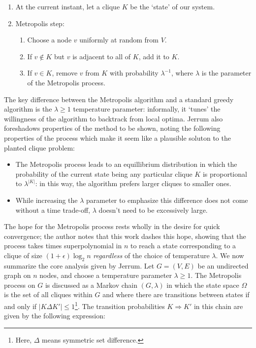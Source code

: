 \documentclass{article}
\theoremstyle{definition}
\begin{document}
\begin{enumerate}
\item{At the current instant, let a clique $K$ be the `state' of our system.}
\item{Metropolis step:}
\begin{enumerate}
\item{Choose a node $v$ uniformly at random from $V$.}
\item{If $v \not\in K$ but $v$ is adjacent to all of $K$, add it to $K$.}
\item{If $v \in K$, remove $v$ from $K$ with probability $\lambda^{-1}$, where 
$\lambda$ is the parameter of the Metropolis process.}
\end{enumerate}
\end{enumerate}

\noindent The key difference between the Metropolis algorithm and a standard greedy 
algorithm is the $\lambda \geq 1$ temperature parameter: informally, it `tunes' the willingness 
of the algorithm to backtrack from local optima.  Jerrum also foreshadows properties 
of the method to be shown, noting the following properties of the process which 
make it seem like a plausible soluton to the planted clique problem:

\begin{itemize}
\item{The Metropolis process leads to an equillibrium distribution in which the 
probability of the current state being any particular clique $K$ is proportional to 
$\lambda^{\lvert K \rvert}$: in this way, the algorithm prefers larger cliques to 
smaller ones.}
\item{While increasing the $\lambda$ parameter to emphasize this difference 
does not come without a time trade-off, $\lambda$ doesn't need to be excessively large.}
\end{itemize}

\noindent The hope for the Metropolis process rests wholly in the desire for 
quick convergence; the author notes that this work dashes this hope, showing that 
the process takes times superpolynomial in $n$ to reach a state corresponding to 
a clique of size $(1+\epsilon) \log_2{n}$ \textit{regardless} of the choice of temperature 
$\lambda$.
\newline\newline
We now summarize the core analysis given by Jerrum.  Let $G=(V,E)$ be an undirected 
graph on $n$ nodes, and choose a temperature parameter $\lambda \geq 1$.  The Metropolis process 
on $G$ is discussed as a Markov chain $(G,\lambda)$ in which the state space 
$\Omega$ is the set of all cliques within $G$ and where there are transitions between states 
if and only if $\lvert K \Delta K' \rvert \leq 1$\footnote{Here, $\Delta$ means symmetric set difference.}.  The transition probabilities $K \Rightarrow K'$ in this chain are given by the following expression:
\end{document}
